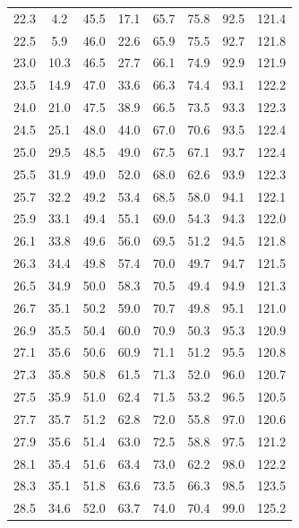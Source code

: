 \documentclass[a4paper,fontset=windows]{ctexart}
\begin{document}
\begin{center}
\begin{longtable}{ cccccccc }
        22.3 &  4.2   & 45.5 & 17.1 & 65.7 & 75.8 & 92.5 & 121.4 \\
        22.5 &  5.9   & 46.0 & 22.6 & 65.9 & 75.5 & 92.7 & 121.8 \\
        23.0 &  10.3  & 46.5 & 27.7 & 66.1 & 74.9 & 92.9 & 121.9 \\
        23.5 &  14.9  & 47.0 & 33.6 & 66.3 & 74.4 & 93.1 & 122.2 \\
        24.0 &  21.0  & 47.5 & 38.9 & 66.5 & 73.5 & 93.3 & 122.3 \\
        24.5 &  25.1  & 48.0 & 44.0 & 67.0 & 70.6 & 93.5 & 122.4 \\
        25.0 &  29.5  & 48.5 & 49.0 & 67.5 & 67.1 & 93.7 & 122.4 \\
        25.5 &  31.9  & 49.0 & 52.0 & 68.0 & 62.6 & 93.9 & 122.3 \\
        25.7 &  32.2  & 49.2 & 53.4 & 68.5 & 58.0 & 94.1 & 122.1 \\
        25.9 &  33.1  & 49.4 & 55.1 & 69.0 & 54.3 & 94.3 & 122.0 \\
        26.1 &  33.8  & 49.6 & 56.0 & 69.5 & 51.2 & 94.5 & 121.8 \\
        26.3 &  34.4  & 49.8 & 57.4 & 70.0 & 49.7 & 94.7 & 121.5 \\
        26.5 &  34.9  & 50.0 & 58.3 & 70.5 & 49.4 & 94.9 & 121.3 \\
        26.7 &  35.1  & 50.2 & 59.0 & 70.7 & 49.8 & 95.1 & 121.0 \\
        26.9 &  35.5  & 50.4 & 60.0 & 70.9 & 50.3 & 95.3 & 120.9 \\
        27.1 &  35.6  & 50.6 & 60.9 & 71.1 & 51.2 & 95.5 & 120.8 \\
        27.3 &  35.8  & 50.8 & 61.5 & 71.3 & 52.0 & 96.0 & 120.7 \\
        27.5 &  35.9  & 51.0 & 62.4 & 71.5 & 53.2 & 96.5 & 120.5 \\
        27.7 &  35.7  & 51.2 & 62.8 & 72.0 & 55.8 & 97.0 & 120.6 \\
        27.9 &  35.6  & 51.4 & 63.0 & 72.5 & 58.8 & 97.5 & 121.2 \\
        28.1 &  35.4  & 51.6 & 63.4 & 73.0 & 62.2 & 98.0 & 122.2 \\
        28.3 &  35.1  & 51.8 & 63.6 & 73.5 & 66.3 & 98.5 & 123.5 \\
        28.5 &  34.6  & 52.0 & 63.7 & 74.0 & 70.4 & 99.0 & 125.2 \\
        \bottomrule[0.1em]
    \end{longtable}
    \end{center}
\end{document}
